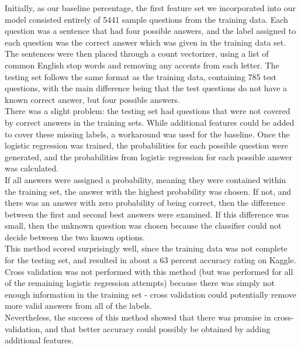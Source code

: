 \documentclass{article}
\theoremstyle{mystuff}
\theoremstyle{myexample}
\theoremstyle{named}
\begin{document}
Initially, as our baseline percentage, the first feature set we incorporated into our model consisted entirely of 5441 sample questions from the training data.  Each question was a sentence that had four possible answers, and the label assigned to each question was the correct answer which was given in the training data set.\\

 The sentences were then placed through a count vectorizer, using a list of common English stop words and removing any accents from each letter.  The testing set follows the same format as the training data, containing 785 test questions, with the main difference being that the test questions do not have a known correct answer, but four possible answers. \\

There was a slight problem: the testing set had questions that were not covered by correct answers in the training sets.  While additional features could be added to cover these missing labels, a workaround was used for the baseline.  Once the logistic regression was trained, the probabilities for each possible question were generated, and the probabilities from logistic regression for each possible answer was calculated. \\

 If all answers were assigned a probability, meaning they were contained within the training set, the answer with the highest probability was chosen.  If not, and there was an answer with zero probability of being correct, then the difference between the first and second best answers were examined.  If this difference was small, then the unknown question was chosen because the classifier could not decide between the two known options. \\

This method scored surprisingly well, since the training data was not complete for the testing set, and resulted in about a 63 percent accuracy rating on Kaggle.  Cross validation was not performed with this method (but was performed for all of the remaining logistic regression attempts) because there was simply not enough information in the training set - cross validation could potentially remove more valid answers from all of the labels.  \\

Nevertheless, the success of this method showed that there was promise in cross-validation, and that better accuracy could possibly be obtained by adding additional features.
\end{document}
